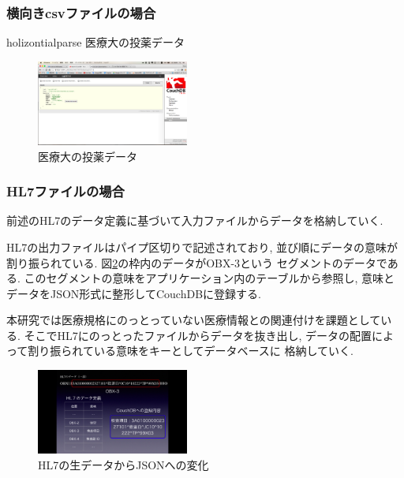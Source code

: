 		\subsubsection{横向きcsvファイルの場合}
			holizontialparse
			医療大の投薬データ
		\fi


			\begin{figure}[htbp]
					\includegraphics[width=5cm, bb=0 0 437 688]{./gazou/touyaku.png}
				\caption{医療大の投薬データ}
				\label{iryoudai-touyaku-data}
			\end{figure}

		\subsubsection{HL7ファイルの場合}
			前述のHL7のデータ定義に基づいて入力ファイルからデータを格納していく.

			HL7の出力ファイルはパイプ区切りで記述されており,
			並び順にデータの意味が割り振られている.
			図\ref{hl7-data-trans}の枠内のデータがOBX-3という
			セグメントのデータである.
			このセグメントの意味をアプリケーション内のテーブルから参照し,
			意味とデータをJSON形式に整形してCouchDBに登録する.



			本研究では医療規格にのっとっていない医療情報との関連付けを課題としている.
			そこでHL7にのっとったファイルからデータを抜き出し,
			データの配置によって割り振られている意味をキーとしてデータベースに
			格納していく.

			\begin{figure}[htbp]
					\includegraphics[width=5cm, bb=0 0 437 688]{./gazou/hl7-data-trans.png}
				\caption{HL7の生データからJSONへの変化}
				\label{hl7-data-trans}
			\end{figure}

